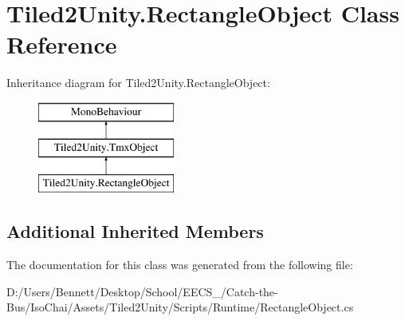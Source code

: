 \hypertarget{class_tiled2_unity_1_1_rectangle_object}{}\section{Tiled2\+Unity.\+Rectangle\+Object Class Reference}
\label{class_tiled2_unity_1_1_rectangle_object}
Inheritance diagram for Tiled2\+Unity.\+Rectangle\+Object\+:\begin{figure}[H]
\begin{center}
\leavevmode
\includegraphics[height=3.000000cm]{class_tiled2_unity_1_1_rectangle_object}
\end{center}
\end{figure}
\subsection*{Additional Inherited Members}


The documentation for this class was generated from the following file\+:\begin{DoxyCompactItemize}
\item 
D\+:/\+Users/\+Bennett/\+Desktop/\+School/\+E\+E\+C\+S\+\_/\+Catch-\/the-\/\+Bus/\+Iso\+Chai/\+Assets/\+Tiled2\+Unity/\+Scripts/\+Runtime/Rectangle\+Object.\+cs\end{DoxyCompactItemize}
